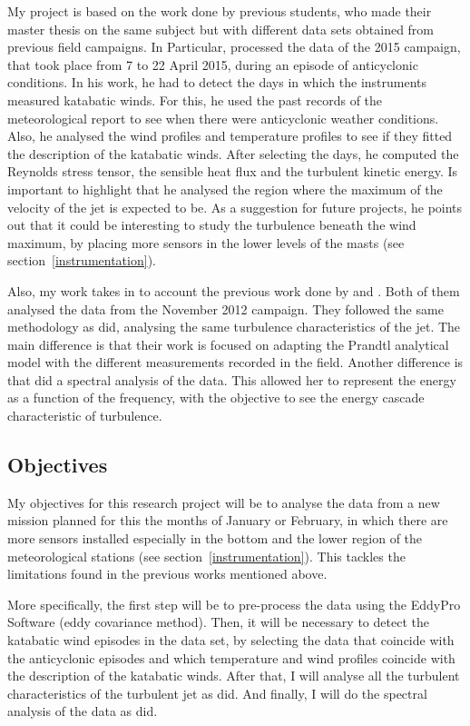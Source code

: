 My project is based on the work done by previous students, who made their master thesis on the same subject but with different data sets obtained from previous field campaigns. In Particular, \cite{jakob} processed the data of the 2015 campaign, that took place from 7 to 22 April 2015, during an episode of anticyclonic conditions. In his work, he had to detect the days in which the instruments measured katabatic winds. For this, he used the past records of the meteorological report to see when there were anticyclonic weather conditions. Also, he analysed the wind profiles and temperature profiles to see if they fitted the description of the katabatic winds. After selecting the days, he computed the Reynolds stress tensor, the sensible heat flux and the turbulent kinetic energy. Is important to highlight that he analysed the region where the maximum of the velocity of the jet is expected to be. As a suggestion for future projects, he points out that it could be interesting to study the turbulence beneath the wind maximum, by placing more sensors in the lower levels of the masts (see section~\ref{instrumentation}).

Also, my work takes in to account the previous work done by \cite{claudine} and \cite{alban}. Both of them analysed the data from the November 2012 campaign. They followed the same methodology as \citeauthor{jakob} did, analysing the same turbulence characteristics of the jet. The main difference is that their work is focused on adapting the Prandtl analytical model with the different measurements recorded in the field. Another difference is that \citeauthor{claudine} did a spectral analysis of the data. This allowed her to represent the energy as a function of the frequency, with the objective to see the energy cascade characteristic of turbulence. 

\subsection{Objectives}
My objectives for this research project will be to analyse the data from a new mission planned for this the months of January or February, in which there are more sensors installed especially in the bottom and the lower region of the meteorological stations (see section~\ref{instrumentation}). This tackles the limitations found in the previous works mentioned above. 

More specifically, the first step will be to pre-process the data using the EddyPro Software (eddy covariance method). Then, it will be necessary to detect the katabatic wind episodes in the data set, by selecting the data that coincide with the anticyclonic episodes and which temperature and wind profiles coincide with the description of the katabatic winds. After that, I will analyse all the turbulent characteristics of the turbulent jet as \citeauthor{jakob} did. And finally, I will do the spectral analysis of the data as \citeauthor{claudine} did. 

